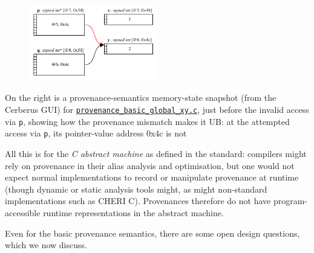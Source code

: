 \documentclass[acmsmall,review,screen]{acmart}\settopmatter{printfolios=true,printccs=false,printacmref=false}
\newcommand{\mytesturl}[1]{https://cerberus.cl.cam.ac.uk/cerberus?defacto/#1}
\newcommand{\mytestlink}[2]{\href{\mytesturl{#1}}{#2}}
\newcommand{\mylsttestlink}[1]{\mytestlink{#1}{\lstinline{#1}}}
\newcommand{\myfooexamplename}[1]{\mylsttestlink{#1}}
\begin{document}
\begin{figure}
\vspace*{-\baselineskip}
\includegraphics[width=0.5\textwidth]{provenance-basic-global-xy-memory.pdf}
\label{fig:pbweb-interface}
\vspace*{-2\baselineskip}
\end{figure}

On the right is a provenance-semantics memory-state snapshot
(from the Cerberus GUI)
for \myfooexamplename{provenance_basic_global_xy.c},
just before the invalid access via \lstinline{p}, showing how the
provenance mismatch makes it UB: at the attempted access via
\lstinline{p}, its pointer-value address 0x4c is not 
%

All this is for the \emph{C abstract machine} as defined in the
standard: compilers might rely on provenance in their alias analysis and
optimisation, but one would not expect normal implementations to record
or manipulate provenance at runtime (though dynamic or static analysis
tools might, as might non-standard implementations such as CHERI
C). Provenances therefore do not have program-accessible runtime representations in the abstract
machine.  


Even for the basic provenance semantics, there are some open design
questions, which we now discuss.
\end{document}

